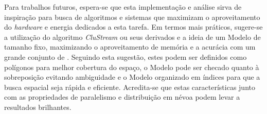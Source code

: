 Para trabalhos futuros, espera-se que esta implementação e análise sirva de
inspiração para busca de algoritmos e sistemas que maximizam o aproveitamento do
\emph{hardware} e energia dedicados a esta tarefa.
Em termos mais práticos, sugere-se a utilização do algoritmo \emph{CluStream}
\cite{Aggarwal2003} ou seus derivados e a ideia de um Modelo de tamanho fixo,
maximizando o aproveitamento de memória e a acurácia com um grande conjunto de
\mclusters.
Seguindo esta sugestão, estes \mclusters podem ser definidos como polígonos para
melhor cobertura do espaço, o Modelo pode ser checado quanto à sobreposição
evitando ambiguidade e o Modelo organizado em índices para que a busca espacial
seja rápida e eficiente.
Acredita-se que estas características junto com as propriedades de paralelismo e
distribuição em névoa podem levar a resultados brilhantes.






